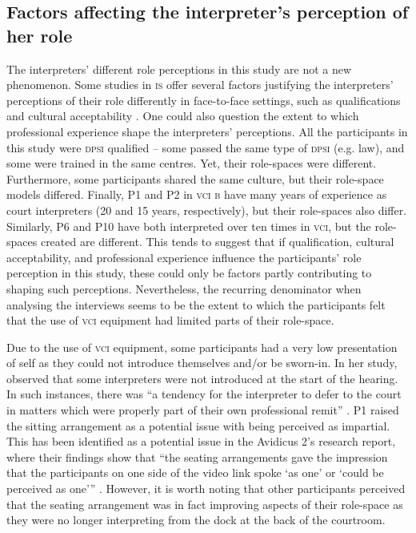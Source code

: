 \documentclass[output=paper]{langsci/langscibook}
\begin{document}
\subsection{Factors affecting the interpreter’s perception of her role}
The interpreters’ different role perceptions in this study are not a new phenomen\-on. Some studies in \textsc{is} offer several factors justifying the interpreters’ perceptions of their role differently in face-to-face settings, such as qualifications \citep{Martin2008} and cultural acceptability \citep{Merlini2009}. One could also question the extent to which professional experience shape the interpreters’ perceptions. All the participants in this study were \textsc{dpsi} qualified -- some passed the same type of \textsc{dpsi} (e.g. law), and some were trained in the same centres. Yet, their role-spaces were different. Furthermore, some participants shared the same culture, but their role-space models differed. Finally, P1 and P2 in \textsc{vci b} have many years of experience as court interpreters (20 and 15 years, respectively), but their role-spaces also differ. Similarly, P6 and P10 have both interpreted over ten times in \textsc{vci}, but the role-spaces created are different. This tends to suggest that if qualification, cultural acceptability, and professional experience influence the participants’ role perception in this study, these could only be factors partly contributing to shaping such perceptions. Nevertheless, the recurring denominator when analysing the interviews seems to be the extent to which the participants felt that the use of \textsc{vci} equipment had limited parts of their role-space. 

Due to the use of \textsc{vci} equipment, some participants had a very low presentation of self as they could not introduce themselves and/or be sworn-in. In her study, \citet{Fowler2013} observed that some interpreters were not introduced at the start of the hearing. In such instances, there was “a tendency for the interpreter to defer to the court in matters which were properly part of their own professional remit” \citep[245]{Fowler2013}. P1 raised the sitting arrangement as a potential issue with being perceived as impartial. This has been identified as a potential issue in the Avidicus 2’s research report, where their findings show that “the seating arrangements gave the impression that the participants on one side of the video link spoke ‘as one’ or ‘could be perceived as one’” \citep[53]{Braun2013}. However, it is worth noting that other participants perceived that the seating arrangement was in fact improving aspects of their role-space as they were no longer interpreting from the dock at the back of the courtroom.
\end{document}
